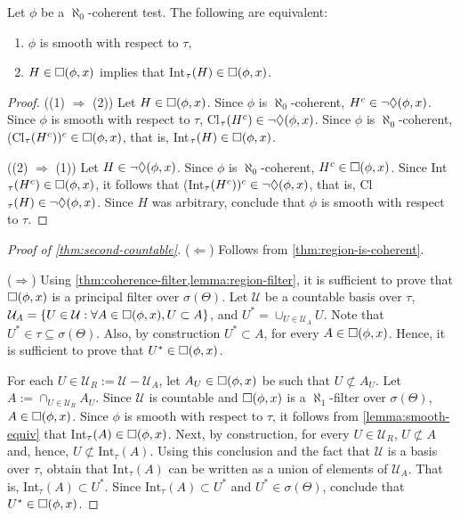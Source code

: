 \begin{lemma}
 \label{lemma:smooth-equiv}
 Let $\phi$ be a $\aleph_0$-coherent test. The following are equivalent:
 \begin{enumerate}
  \item $\phi$ is smooth with respect to $\tau$,
  \item $H \in \square({\phi,x})$ implies that Int$_{\tau}(H) \in \square({\phi,x})$.
 \end{enumerate}
\end{lemma}

\begin{proof}
 ((1) $\Longrightarrow$ (2)) Let $H \in \square({\phi,x})$. Since $\phi$ is $\aleph_0$-coherent, $H^c \in \lnot \Diamond({\phi,x})$. Since $\phi$ is smooth with respect to $\tau$, Cl$_{\tau}(H^c) \in \lnot \Diamond({\phi,x})$. Since $\phi$ is $\aleph_0$-coherent, (Cl$_{\tau}(H^c))^c \in \square({\phi,x})$, that is, Int$_\tau(H) \in \square({\phi,x})$.

 ((2) $\Longrightarrow$ (1)) Let $H \in \lnot \Diamond({\phi,x})$. Since $\phi$ is $\aleph_0$-coherent, $H^c \in \square({\phi,x})$. Since Int$_{\tau}(H^c) \in \square({\phi,x})$, it follows that (Int$_{\tau}(H^c))^c \in \lnot \Diamond({\phi,x})$, that is, Cl$_{\tau}(H) \in \lnot \Diamond({\phi,x})$. Since $H$ was arbitrary, conclude that $\phi$ is smooth with respect to $\tau$.
\end{proof}

\begin{proof}[Proof of \cref{thm:second-countable}]
 ($\Longleftarrow$) Follows from
 \cref{thm:region-is-coherent}.

 ($\Longrightarrow$)
 Using \cref{thm:coherence-filter,lemma:region-filter},
 it is sufficient to prove that $\square({\phi,x})$ is a principal filter over $\sigma(\Theta)$. Let $\mathcal{U}$ be a countable basis over $\tau$, $\mathcal{U}_A = \{U \in \mathcal{U}: \forall A \in \square({\phi,x}), U \subset A\}$, and $U^* = \cup_{U \in \mathcal{U}_A} U$. Note that $U^* \in \tau \subseteq \sigma(\Theta)$.
 Also, by construction $U^* \subset A$, for every $A \in \square({\phi,x})$. Hence, it is sufficient to prove that $U^* \in \square({\phi,x})$.
 
 For each $U \in \mathcal{U}_R := \mathcal{U} - \mathcal{U}_A$, let $A_U \in \square({\phi,x})$ be such that
 $U \not\subset A_U$. Let $A := \cap_{U \in \mathcal{U}_R}A_U$. Since $\mathcal{U}$ is countable and $\square({\phi,x})$ is a $\aleph_1$-filter over $\sigma(\Theta)$,
 $A \in \square({\phi,x})$. Since $\phi$ is smooth with respect to $\tau$, it follows from \cref{lemma:smooth-equiv} that Int$_\tau(A) \in \square({\phi,x})$.
 Next, by construction, for every $U \in \mathcal{U}_R$, $U \not\subset A$ and, hence, $U \not\subset \text{Int}_\tau(A)$. Using this conclusion and the fact that $\mathcal{U}$ is a basis over $\tau$, obtain that $\text{Int}_\tau(A)$ can be written as a union of elements of $\mathcal{U}_A$. That is, Int$_\tau(A) \subset U^*$. Since $\text{Int}_\tau(A) \subset U^*$ and $U^* \in \sigma(\Theta)$, conclude that $U^* \in \square({\phi,x})$.
\end{proof}

